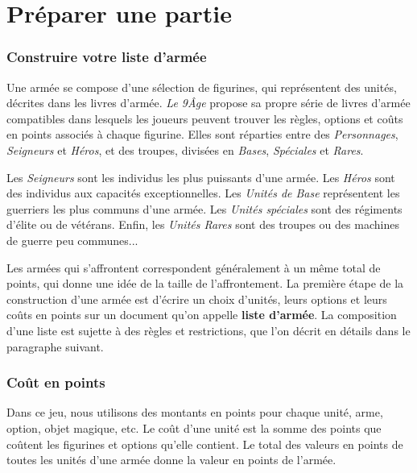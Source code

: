 
\part{Préparer une partie}

\section{Construire votre liste d'armée}
\label{construire_liste}


Une armée se compose d'une sélection de figurines, qui représentent des unités, décrites dans les livres d'armée. \emph{Le 9\ieme Âge} propose sa propre série de livres d'armée compatibles dans lesquels les joueurs peuvent trouver les règles, options et coûts en points associés à chaque figurine. Elles sont réparties entre des \emph{Personnages}, \emph{Seigneurs} et \emph{Héros}, et des troupes, divisées en \emph{Bases}, \emph{Spéciales} et \emph{Rares}.

Les \emph{Seigneurs} sont les individus les plus puissants d'une armée. Les \emph{Héros} sont des individus aux capacités exceptionnelles. Les \emph{Unités de Base} représentent les guerriers les plus communs d'une armée. Les \emph{Unités spéciales} sont des régiments d'élite ou de vétérans. Enfin, les \emph{Unités Rares} sont des troupes ou des machines de guerre peu communes...

Les armées qui s'affrontent correspondent généralement à un même total de points, qui donne une idée de la taille de l'affrontement. La première étape de la construction d'une armée est d'écrire un choix d'unités, leurs options et leurs coûts en points sur un document qu'on appelle \textbf{liste d'armée}. La composition d'une liste est sujette à des règles et restrictions, que l'on décrit en détails dans le paragraphe suivant.

\section{Coût en points}

Dans ce jeu, nous utilisons des montants en points pour chaque unité, arme, option, objet magique, etc. Le coût d'une unité est la somme des points que coûtent les figurines et options qu'elle contient. Le total des valeurs en points de toutes les unités d'une armée donne la valeur en points de l'armée.


